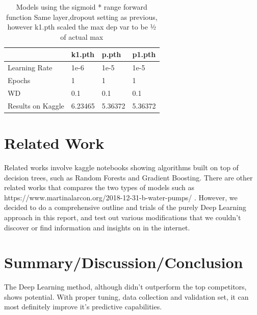 \documentclass[10pt,twocolumn,letterpaper]{article}
\begin{document}
\begin{table}[]
  \begin{center}
    \begin{tabular}{|l|l|l|l|}
    \hline
                      & k1.pth  & p.pth   & p1.pth  \\ \hline
    Learning Rate     & 1e-6    & 1e-5    & 1e-5    \\ \hline
    Epochs            & 1       & 1       & 1       \\ \hline
    WD                & 0.1     & 0.1     & 0.1     \\ \hline
    Results on Kaggle & 6.23465 & 5.36372 & 5.36372 \\ \hline
    \end{tabular}
  \end{center}
  \caption{Models using the sigmoid * range forward function Same layer,dropout
  setting as previous, however k1.pth scaled the max dep var to be ½ of actual
  max}
\end{table}


\section{Related Work}
Related works involve kaggle notebooks showing algorithms built on top of
decision trees, such as Random Forests and Gradient Boosting. There are other
related works that compares the two types of models such as
https://www.martinalarcon.org/2018-12-31-b-water-pumps/ \cite{martin-alarcon}.
However, we decided to do a comprehensive outline and trials of the purely Deep
Learning approach in this report, and test out various modifications that we
couldn’t discover or find information and insights on in the internet.


\section{Summary/Discussion/Conclusion}
The Deep Learning method, although didn’t outperform the top competitors, shows
potential. With proper tuning, data collection and validation set, it can most
definitely improve it’s predictive capabilities.
\end{document}
